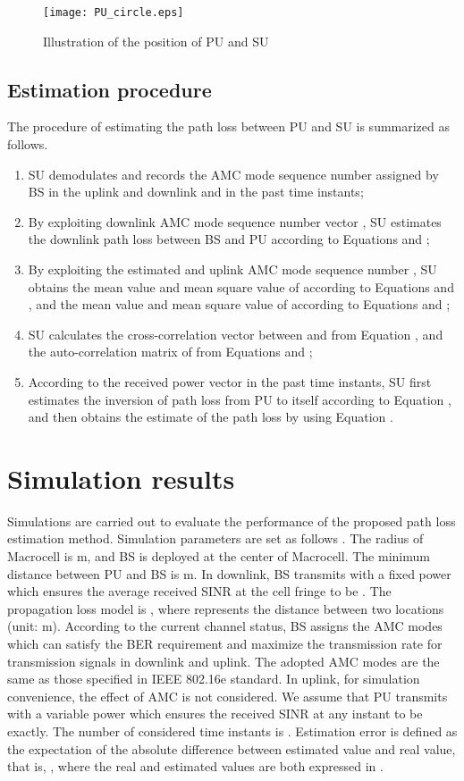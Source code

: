 \documentclass[conference]{IEEEtran}
\begin{document}
\begin{figure}[!t]
\centering
\texttt{[image: PU\_circle.eps]}
\caption{Illustration of the position of PU and SU}
\label{PU_circle}
\end{figure}

\subsection{Estimation procedure}
The procedure of estimating the path loss between PU and SU  is summarized as follows.
\begin{enumerate}
\item SU demodulates and records the AMC mode sequence number
assigned by BS in the uplink and downlink  and  in
the past  time instants;
\item By exploiting downlink AMC mode sequence number vector
, SU estimates the downlink path loss between BS and PU
 according to Equations  and ;
\item By exploiting the estimated  and uplink AMC mode sequence
number , SU obtains the mean value  and mean
square value  of  according to
Equations  and , and the mean value  and mean
square value  of  according to Equations 
and ;
\item SU calculates the cross-correlation vector
 between  and  from Equation
, and the auto-correlation matrix  of  from Equations  and ;
\item According to the received power vector  in the past
 time instants, SU first estimates the inversion of path loss
from PU to itself according to Equation , and then obtains the
estimate of the path loss by using Equation .
\end{enumerate}
\section{Simulation results}
Simulations are carried out to evaluate the performance of the
proposed path loss estimation method. Simulation parameters are set
as follows \cite{c9}. The radius of Macrocell is  m, and BS is
deployed at the center of Macrocell. The minimum distance between PU
and BS is  m. In downlink, BS transmits with a fixed power 
which ensures the average received SINR at the cell fringe to be . The propagation loss model is ,
where  represents the distance between two locations (unit: m).
According to the current channel status, BS assigns the AMC modes
which can satisfy the BER requirement and maximize the transmission
rate for transmission signals in downlink and uplink. The adopted
AMC modes are the same as those specified in IEEE 802.16e standard.
In uplink, for simulation convenience, the effect of AMC is not
considered. We assume that PU transmits with a variable power which
ensures the received SINR at any instant to be  exactly. The
number of considered time instants is . Estimation error is
defined as the expectation of the absolute difference between
estimated value and real value, that is, , where the real and
estimated values are both expressed in .
\end{document}
